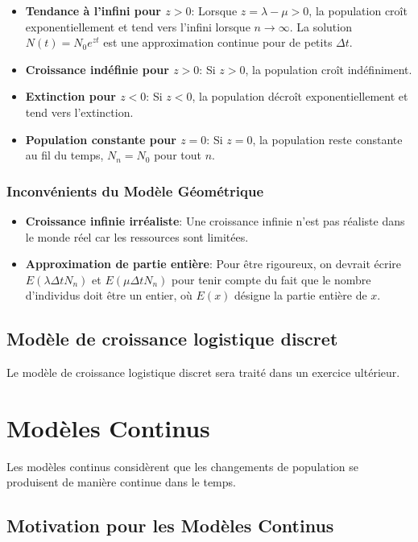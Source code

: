 \documentclass{article}
\begin{document}
\begin{itemize}
    \item \textbf{Tendance à l'infini pour $z > 0$}: Lorsque $z = \lambda - \mu > 0$, la population croît exponentiellement et tend vers l'infini lorsque $n \to \infty$. La solution $N(t) = N_0 e^{zt}$ est une approximation continue pour de petits $\Delta t$.
    \item \textbf{Croissance indéfinie pour $z > 0$}: Si $z > 0$, la population croît indéfiniment.
    \item \textbf{Extinction pour $z < 0$}: Si $z < 0$, la population décroît exponentiellement et tend vers l'extinction.
    \item \textbf{Population constante pour $z = 0$}: Si $z = 0$, la population reste constante au fil du temps, $N_n = N_0$ pour tout $n$.
\end{itemize}

\subsubsection{Inconvénients du Modèle Géométrique}

\begin{itemize}
    \item \textbf{Croissance infinie irréaliste}: Une croissance infinie n'est pas réaliste dans le monde réel car les ressources sont limitées.
    \item \textbf{Approximation de partie entière}: Pour être rigoureux, on devrait écrire $E(\lambda \Delta t N_n)$ et $E(\mu \Delta t N_n)$ pour tenir compte du fait que le nombre d'individus doit être un entier, où $E(x)$ désigne la partie entière de $x$.
\end{itemize}

\subsection{Modèle de croissance logistique discret}
Le modèle de croissance logistique discret sera traité dans un exercice ultérieur.

\section{Modèles Continus}

Les modèles continus considèrent que les changements de population se produisent de manière continue dans le temps.

\subsection{Motivation pour les Modèles Continus}
\end{document}
